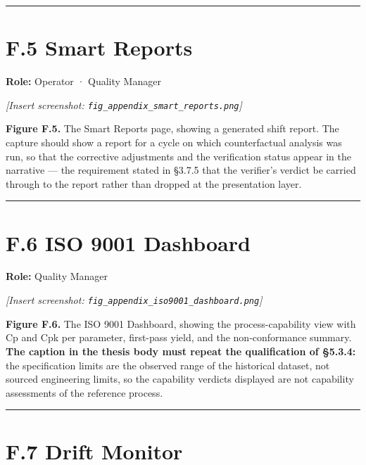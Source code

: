 \begin{center}\rule{0.5\linewidth}{0.5pt}\end{center}

\hypertarget{f.5-smart-reports}{%
\section{F.5 Smart Reports}\label{f.5-smart-reports}}

\textbf{Role:} Operator · Quality Manager

\emph{{[}Insert screenshot: \texttt{fig\_appendix\_smart\_reports.png}{]}}

\textbf{Figure F.5.} The Smart Reports page, showing a generated shift report. The capture should show a report for a cycle on which counterfactual analysis was run, so that the corrective adjustments and the verification status appear in the narrative --- the requirement stated in §3.7.5 that the verifier's verdict be carried through to the report rather than dropped at the presentation layer.

\begin{center}\rule{0.5\linewidth}{0.5pt}\end{center}

\hypertarget{f.6-iso-9001-dashboard}{%
\section{F.6 ISO 9001 Dashboard}\label{f.6-iso-9001-dashboard}}

\textbf{Role:} Quality Manager

\emph{{[}Insert screenshot: \texttt{fig\_appendix\_iso9001\_dashboard.png}{]}}

\textbf{Figure F.6.} The ISO 9001 Dashboard, showing the process-capability view with Cp and Cpk per parameter, first-pass yield, and the non-conformance summary. \textbf{The caption in the thesis body must repeat the qualification of §5.3.4:} the specification limits are the observed range of the historical dataset, not sourced engineering limits, so the capability verdicts displayed are not capability assessments of the reference process.

\begin{center}\rule{0.5\linewidth}{0.5pt}\end{center}

\hypertarget{f.7-drift-monitor}{%
\section{F.7 Drift Monitor}\label{f.7-drift-monitor}}

